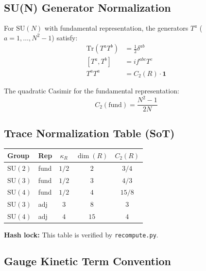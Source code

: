 \documentclass[11pt,a4paper]{article}
\theoremstyle{definition}
\begin{document}
\subsection{SU(N) Generator Normalization}
\label{subsec:sun-generators}

For $\text{SU}(N)$ with fundamental representation, the generators $T^a$
($a = 1, \ldots, N^2 - 1$) satisfy:
\begin{align}
  \label{eq:sun-trace}
  \text{Tr}(T^a T^b) &= \frac{1}{2} \delta^{ab} \\
  \label{eq:sun-commutator}
  [T^a, T^b] &= i f^{abc} T^c \\
  \label{eq:sun-casimir}
  T^a T^a &= C_2(R) \cdot \mathbf{1}
\end{align}

The quadratic Casimir for the fundamental representation:
\begin{equation}
  \label{eq:casimir-fund}
  C_2(\text{fund}) = \frac{N^2 - 1}{2N}
\end{equation}

\subsection{Trace Normalization Table (SoT)}
\label{subsec:trace-table}

\begin{hashbox}
\begin{center}
\begin{tabular}{llccc}
\toprule
\textbf{Group} & \textbf{Rep} & $\kappa_R$ & $\dim(R)$ & $C_2(R)$ \\
\midrule
$\text{SU}(2)$ & fund & $1/2$ & $2$ & $3/4$ \\
$\text{SU}(3)$ & fund & $1/2$ & $3$ & $4/3$ \\
$\text{SU}(4)$ & fund & $1/2$ & $4$ & $15/8$ \\
$\text{SU}(3)$ & adj & $3$ & $8$ & $3$ \\
$\text{SU}(4)$ & adj & $4$ & $15$ & $4$ \\
\bottomrule
\end{tabular}
\end{center}
\textbf{Hash lock:} This table is verified by \texttt{recompute.py}.
\end{hashbox}

\subsection{Gauge Kinetic Term Convention}
\label{subsec:kinetic-convention}
\end{document}
